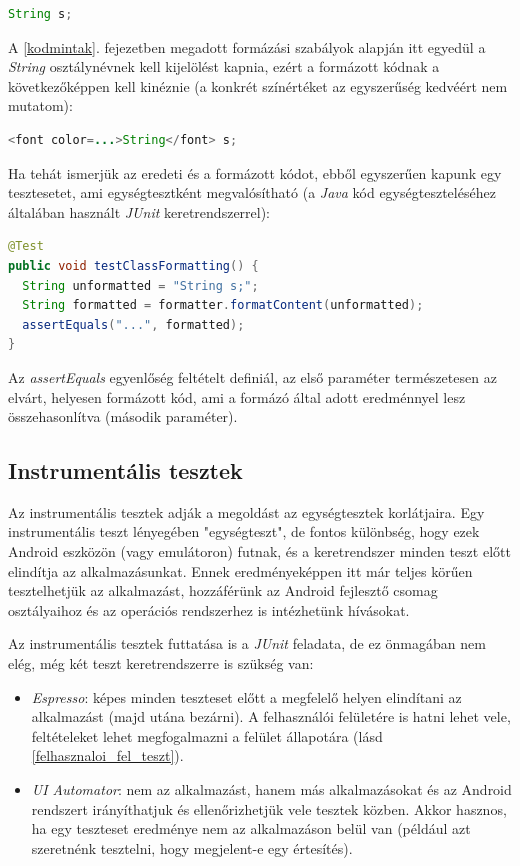 \documentclass[12pt,a4paper]{article}
\begin{document}
	\begin{lstlisting}[language=Java]
String s;
	\end{lstlisting}
	
	A \ref{kodmintak}. fejezetben megadott formázási szabályok alapján itt egyedül a \textit{String} osztálynévnek kell kijelölést kapnia, ezért a formázott kódnak a következőképpen kell kinéznie (a konkrét színértéket az egyszerűség kedvéért nem mutatom):
	
	\begin{lstlisting}[language=Java]
<font color=...>String</font> s;
	\end{lstlisting}
	
	Ha tehát ismerjük az eredeti és a formázott kódot, ebből egyszerűen kapunk egy tesztesetet, ami egységtesztként megvalósítható (a \textit{Java} kód egységteszteléséhez általában használt \textit{JUnit} keretrendszerrel):
	
	\begin{lstlisting}[language=Java]
@Test
public void testClassFormatting() {
  String unformatted = "String s;";
  String formatted = formatter.formatContent(unformatted);
  assertEquals("...", formatted);
}
	\end{lstlisting}
	
	Az \textit{assertEquals} egyenlőség feltételt definiál, az első paraméter természetesen az elvárt, helyesen formázott kód, ami a formázó által adott eredménnyel lesz összehasonlítva (második paraméter).
	
	\subsection{Instrumentális tesztek}\label{instrumental_tests}

	Az instrumentális tesztek adják a megoldást az egységtesztek korlátjaira. Egy instrumentális teszt lényegében "egységteszt", de fontos különbség, hogy ezek Android eszközön (vagy emulátoron) futnak, és a keretrendszer minden teszt előtt elindítja az alkalmazásunkat. Ennek eredményeképpen itt már teljes körűen tesztelhetjük az alkalmazást, hozzáférünk az Android fejlesztő csomag osztályaihoz és az operációs rendszerhez is intézhetünk hívásokat.
	
	Az instrumentális tesztek futtatása is a \textit{JUnit} feladata, de ez önmagában nem elég, még két teszt keretrendszerre is szükség van:
	
	\begin{itemize}
		\item \textit{Espresso}: képes minden teszteset előtt a megfelelő helyen elindítani az alkalmazást (majd utána bezárni). A felhasználói felületére is hatni lehet vele, feltételeket lehet megfogalmazni a felület állapotára (lásd \ref{felhasznaloi_fel_teszt}).
		\item \textit{UI Automator}: nem az alkalmazást, hanem más alkalmazásokat és az Android rendszert irányíthatjuk és ellenőrizhetjük vele tesztek közben. Akkor hasznos, ha egy teszteset eredménye nem az alkalmazáson belül van (például azt szeretnénk tesztelni, hogy megjelent-e egy értesítés).
	\end{itemize}
	
\end{document}
